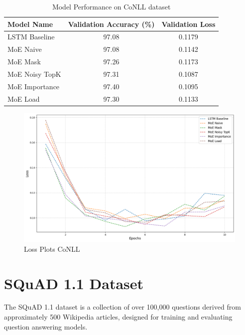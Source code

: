 \documentclass[12pt]{article}
\begin{document}
\begin{table}[h]
  \centering
  \begin{tabular}{lcc}
  \hline
  \textbf{Model Name} & \textbf{Validation Accuracy (\%)} & \textbf{Validation Loss} \\ \hline
  LSTM Baseline       &97.08                         &0.1179                    \\
  MoE Naive           &97.08                         &0.1142                    \\
  MoE Mask            &97.26                         &0.1173                    \\
  MoE Noisy TopK      &97.31                         &0.1087                    \\
  MoE Importance      &97.40                         &0.1095                    \\
  MoE Load            &97.30                         &0.1133                    \\ \hline
  \end{tabular}
  \caption{Model Performance on CoNLL dataset}
  \label{tab:performance_conll}
  \end{table}
  
\begin{figure}[h]
  \centering
  \includegraphics[width=1\linewidth]{report_images/conll/loss.png}
  \caption{\label{fig: conll_losses}Loss Plots CoNLL}
  \end{figure}
  \noindent



\section{SQuAD 1.1 Dataset}
The SQuAD 1.1 dataset is a collection of over 100,000 questions derived from approximately 500 Wikipedia articles, designed for training and evaluating question answering models. 
\end{document}
